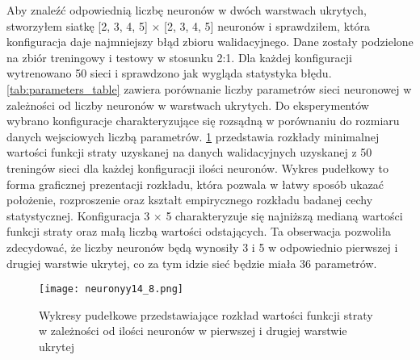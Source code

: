 \documentclass[]{article}
\theoremstyle{definition}
\begin{document}
Aby znaleźć odpowiednią liczbę neuronów w dwóch warstwach ukrytych, stworzyłem siatkę [2, 3, 4, 5] $\times$ [2, 3, 4, 5] neuronów i sprawdziłem, która konfiguracja daje najmniejszy błąd zbioru walidacyjnego. Dane zostały podzielone na zbiór treningowy i testowy w stosunku 2:1. Dla każdej konfiguracji wytrenowano 50 sieci i sprawdzono jak wygląda statystyka błędu. \tablename{} \ref{tab:parameters_table} zawiera porównanie liczby parametrów sieci neuronowej w zależności od liczby neuronów w warstwach ukrytych. Do eksperymentów wybrano konfiguracje charakteryzujące się rozsądną w porównaniu do rozmiaru danych wejsciowych liczbą parametrów. \figurename{} \ref{fig:neurony} przedstawia rozkłady minimalnej wartości funkcji straty uzyskanej na danych walidacyjnych uzyskanej z 50 treningów sieci dla każdej konfiguracji ilości neuronów. Wykres pudełkowy to forma graficznej prezentacji rozkładu, która pozwala w łatwy sposób ukazać położenie, rozproszenie oraz kształt empirycznego rozkładu badanej cechy statystycznej. Konfiguracja 3 $\times$ 5 charakteryzuje się najniższą medianą wartości funkcji straty oraz małą liczbą wartości odstających. Ta obserwacja pozwoliła zdecydować, że liczby neuronów będą wynosiły 3 i 5 w odpowiednio pierwszej i drugiej warstwie ukrytej, co za tym idzie sieć będzie miała 36 parametrów.




\begin{figure}[htp!]
	\centering
	\texttt{[image: neuronyy14\_8.png]}
	\caption{Wykresy pudełkowe przedstawiające rozkład wartości funkcji straty w zależności od ilości neuronów w pierwszej i drugiej warstwie ukrytej}
	\label{fig:neurony}
\end{figure}
\end{document}
